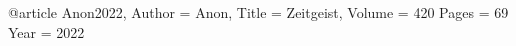 @article{
	Anon2022,
	Author = {{A}non},
	Title = {{Z}eitgeist},
	Volume = {420}
	Pages = {69}
	Year = {2022}
}